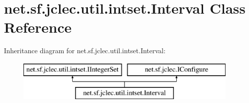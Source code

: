 \hypertarget{classnet_1_1sf_1_1jclec_1_1util_1_1intset_1_1_interval}{\section{net.\-sf.\-jclec.\-util.\-intset.\-Interval Class Reference}
\label{classnet_1_1sf_1_1jclec_1_1util_1_1intset_1_1_interval}
}
Inheritance diagram for net.\-sf.\-jclec.\-util.\-intset.\-Interval\-:\begin{figure}[H]
\begin{center}
\leavevmode
\includegraphics[height=2.000000cm]{classnet_1_1sf_1_1jclec_1_1util_1_1intset_1_1_interval}
\end{center}
\end{figure}

